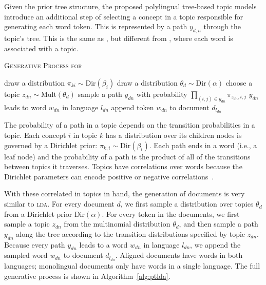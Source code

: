 Given the prior tree structure, the proposed polylingual tree-based topic models introduce an additional step of selecting a concept in a topic responsible for generating each word token. This is represented by a path $y_{d,n}$ through the topic's tree. This is the same as \tlda{}, but different from , where each word is associated with a topic. 

\begin{algorithm}[t!]
\begin{footnotesize}
\caption{\textsc{\small{Generative Process for \ptlda{}}}}
\label{alg:ptlda}
\begin{algorithmic}[1]
  \STATE draw a distribution $\pi_{ki} \sim \text{Dir}(\beta_i)$
  \ENDFOR
  \ENDFOR
  \STATE draw a distribution $\theta_d \sim \text{Dir}(\alpha)$
  \STATE choose a topic $z_{dn} \sim \text{Mult}(\theta_d)$
  \STATE sample a path $y_{dn}$ with probability $\prod_{(i,j) \in y_{dn}} \pi_{z_{dn}, i, j}$
  \STATE $y_{dn}$ leads to word $w_{dn}$ in language $l_{dn}$
  \STATE append token $w_{dn}$ to document $d_{l_{dn}}$
  \ENDFOR
  \ENDFOR
\end{algorithmic}
\end{footnotesize}
\end{algorithm}


The probability of a path in a topic depends on the transition probabilities in a topic.  Each concept $i$ in topic $k$ has a distribution over its children nodes is governed by a Dirichlet prior: $\pi_{k,i} \sim \text{Dir}(\beta_{i})$.  Each path ends in a word (i.e., a leaf node) and the probability of a path is the product of all of the transitions between topics it traverses. Topics have correlations over words because the Dirichlet parameters can encode positive or negative correlations~\citep{andrzejewski-09}.

With these correlated in topics in hand, the generation of documents is very similar to \textsc{lda}.  For every document $d$, we first sample a distribution over topics $\theta_d$ from a Dirichlet prior $\text{Dir}(\alpha)$.  For every token in the documents, we first sample a topic $z_{dn}$ from the multinomial distribution $\theta_d$, and then sample a path $y_{dn}$ along the tree according to the transition distributions specified by topic $z_{dn}$.  Because every path $y_{dn}$ leads to a word $w_{dn}$ in language $l_{dn}$, we append the sampled word $w_{dn}$ to document $d_{l_{dn}}$.  Aligned documents have words in both languages; monolingual documents only have words in a single language. The full generative process is shown in Algorithm~\ref{alg:ptlda}.

